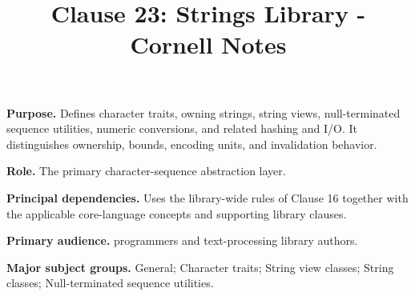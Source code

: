 \documentclass[11pt,letterpaper]{article}
\title{Clause 23: Strings Library - Cornell Notes}
\author{}
\date{}
\begin{document}
\maketitle
\begin{CornellReferenceOrientationBox}
\textbf{Purpose.} Defines character traits, owning strings, string views, null-terminated sequence utilities, numeric conversions, and related hashing and I/O. It distinguishes ownership, bounds, encoding units, and invalidation behavior.
\par\textbf{Role.} The primary character-sequence abstraction layer.
\par\textbf{Principal dependencies.} Uses the library-wide rules of Clause 16 together with the applicable core-language concepts and supporting library clauses.
\par\textbf{Primary audience.} programmers and text-processing library authors.
\par\textbf{Major subject groups.} General; Character traits; String view classes; String classes; Null-terminated sequence utilities.
\end{CornellReferenceOrientationBox}
\end{document}

